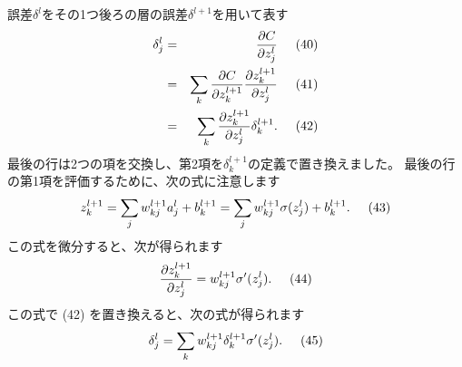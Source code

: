 \documentclass[11pt,a4j,fleqn]{jarticle}
\begin{document}
\begin{spacing}{1.5}
\normalsize 誤差$\delta^l$をその1つ後ろの層の誤差$\delta^{l+1}$を用いて表す
\begin{eqnarray}
  \delta^l_j & = & \frac{\partial C}{\partial z^l_j}\nonumber  \hspace{5mm}(40)  \\
  & = & \sum_k \frac{\partial C}{\partial z^{l+1}_k} \frac{\partial z^{l+1}_k}{\partial z^l_j} \hspace{5mm} (41) \nonumber \\
  & = & \sum_k \frac{\partial z^{l+1}_k}{\partial z^l_j} \delta^{l+1}_k. \hspace{5mm} (42) \nonumber
\end{eqnarray}
最後の行は2つの項を交換し、第2項を$\delta^{l+1}_k$の定義で置き換えました。 最後の行の第1項を評価するために、次の式に注意します\\
\begin{eqnarray}
  z^{l+1}_k = \sum_j w^{l+1}_{kj} a^l_j +b^{l+1}_k = \sum_j w^{l+1}_{kj} \sigma(z^l_j) +b^{l+1}_k. \hspace{5mm} (43) \nonumber
\end{eqnarray}
この式を微分すると、次が得られます
\begin{eqnarray}
  \frac{\partial z^{l+1}_k}{\partial z^l_j} = w^{l+1}_{kj} \sigma'(z^l_j). \hspace{5mm} (44) \nonumber
\end{eqnarray}
この式で (42) を置き換えると、次の式が得られます
\begin{eqnarray}
  \delta^l_j = \sum_k w^{l+1}_{kj}  \delta^{l+1}_k \sigma'(z^l_j).  \hspace{5mm} (45) \nonumber
\end{eqnarray}

\end{spacing}
\end{document}
